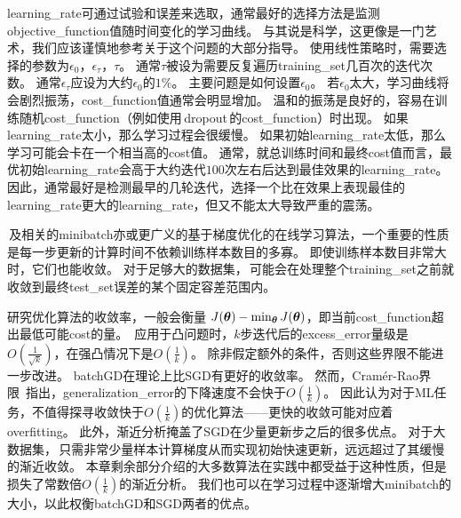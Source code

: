
\gls{learning_rate}可通过试验和误差来选取，通常最好的选择方法是监测\gls{objective_function}值随时间变化的学习曲线。
与其说是科学，这更像是一门艺术，我们应该谨慎地参考关于这个问题的大部分指导。
使用线性策略时，需要选择的参数为$\epsilon_0$，$\epsilon_\tau$，$\tau$。  
通常$\tau$被设为需要反复遍历\gls{training_set}几百次的迭代次数。
通常$\epsilon_\tau$应设为大约$\epsilon_0$的$1\%$。
主要问题是如何设置$\epsilon_0$。
若$\epsilon_0$太大，学习曲线将会剧烈振荡，\gls{cost_function}值通常会明显增加。
温和的振荡是良好的，容易在训练随机\gls{cost_function}（例如使用\,\gls{dropout}\,的\gls{cost_function}）时出现。
如果\gls{learning_rate}太小，那么学习过程会很缓慢。
如果初始\gls{learning_rate}太低，那么学习可能会卡在一个相当高的\gls{cost}值。
通常，就总训练时间和最终\gls{cost}值而言，最优初始\gls{learning_rate}会高于大约迭代$100$次左右后达到最佳效果的\gls{learning_rate}。
因此，通常最好是检测最早的几轮迭代，选择一个比在效果上表现最佳的\gls{learning_rate}更大的\gls{learning_rate}，但又不能太大导致严重的震荡。  


\,及相关的\gls{minibatch}亦或更广义的基于梯度优化的在线学习算法，一个重要的性质是每一步更新的计算时间不依赖训练样本数目的多寡。
即使训练样本数目非常大时，它们也能收敛。
对于足够大的数据集，\,可能会在处理整个\gls{training_set}之前就收敛到最终\gls{test_set}误差的某个固定容差范围内。



研究优化算法的收敛率，一般会衡量 $J(\boldsymbol{\theta}) - \min_{\boldsymbol{\theta}} J(\boldsymbol{\theta})$，即当前\gls{cost_function}超出最低可能\gls{cost}的量。
\,应用于凸问题时，$k$步迭代后的\gls{excess_error}量级是$O(\frac{1}{\sqrt{k}})$，在强凸情况下是$O(\frac{1}{k})$。
除非假定额外的条件，否则这些界限不能进一步改进。
\gls{batch}\gls{GD}在理论上比\gls{SGD}有更好的收敛率。
然而，Cram\'er-Rao界限~\citep{Cramer-1946,Rao-1945}指出，\gls{generalization_error}的下降速度不会快于$O(\frac{1}{k})$。
\cite{bottou-bousquet-2008-small}因此认为对于\gls{ML}任务，不值得探寻收敛快于$O(\frac{1}{k})$的优化算法——更快的收敛可能对应着\gls{overfitting}。
此外，渐近分析掩盖了\gls{SGD}在少量更新步之后的很多优点。
对于大数据集，\,只需非常少量样本计算梯度从而实现初始快速更新，远远超过了其缓慢的渐近收敛。
本章剩余部分介绍的大多数算法在实践中都受益于这种性质，但是损失了常数倍$O(\frac{1}{k})$的渐近分析。
我们也可以在学习过程中逐渐增大\gls{minibatch}的大小，以此权衡\gls{batch}\gls{GD}和\gls{SGD}两者的优点。

